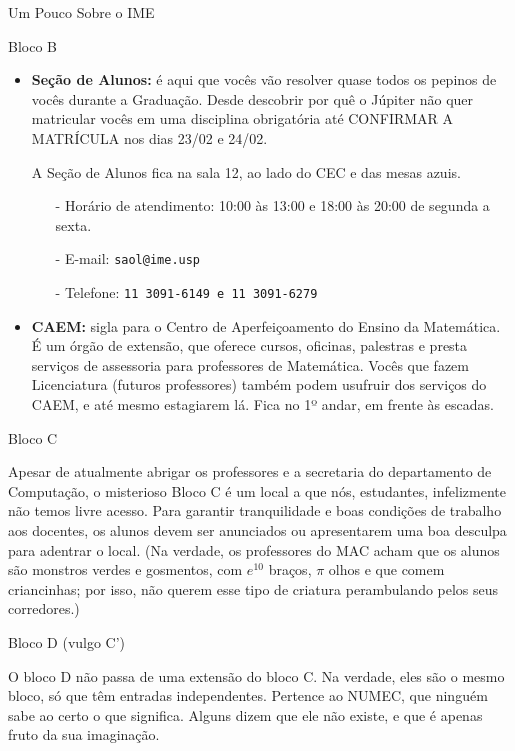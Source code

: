 \begin{secao}{Um Pouco Sobre o IME}
\begin{subsecao}{Bloco B}
\begin{itemize}
\item {\bf Seção de Alunos:} é aqui que vocês vão resolver quase todos os pepinos 
de vocês durante a Graduação. Desde descobrir por quê o Júpiter não quer matricular vocês
em uma disciplina obrigatória até CONFIRMAR A MATRÍCULA nos dias 23/02 e 24/02. %

A Seção de Alunos fica na sala 12, ao lado do CEC e das mesas azuis.
\begin{itemize}
\item[-] Horário de atendimento: 10:00 às 13:00 e 18:00 às 20:00 de segunda a sexta.
\item[-] E-mail: \tt{saol@ime.usp}
\item[-] Telefone: \tt{11 3091-6149} e \tt{11 3091-6279}
\end{itemize}

\item {\bf CAEM:} sigla para o Centro de Aperfeiçoamento do Ensino da Matemática.
É um órgão de extensão, que oferece cursos, oficinas, palestras e presta serviços
de assessoria para professores de Matemática. Vocês que fazem Licenciatura (futuros 
professores) também podem usufruir dos serviços do CAEM, e até mesmo estagiarem lá. 
Fica no 1º andar, em frente às escadas.

\end{itemize}
\end{subsecao}

\begin{subsecao}{Bloco C}

Apesar de atualmente abrigar os professores e a secretaria do departamento de
Computação, o misterioso Bloco C é um local a que nós, estudantes, infelizmente não
temos livre acesso. Para garantir tranquilidade e boas condições de trabalho aos
docentes, os alunos devem ser anunciados ou apresentarem uma boa desculpa para 
adentrar o local. (Na verdade, os professores do MAC acham que os alunos são monstros
verdes e gosmentos, com $e^{10}$ braços, $\pi$ olhos e que comem criancinhas;
por isso, não querem esse tipo de criatura perambulando pelos seus corredores.)

\end{subsecao}

\begin{subsecao}{Bloco D (vulgo C')}

O bloco D não passa de uma extensão do bloco C. Na verdade, eles são o mesmo bloco,
só que têm entradas independentes. Pertence ao NUMEC, que ninguém sabe ao certo
o que significa. Alguns dizem que ele não existe, e que é apenas fruto da sua
imaginação.


\end{subsecao}
\end{secao}
